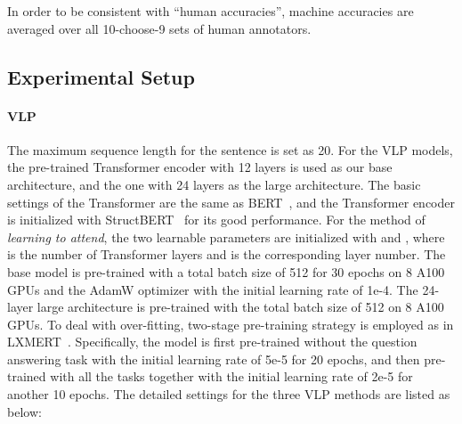 In order to be consistent with ``human accuracies'', machine accuracies are averaged over all 10-choose-9 sets of human annotators.

\subsection{Experimental Setup}
\paragraph{VLP} The maximum sequence length for the sentence is set as 20. For the VLP models, the pre-trained Transformer encoder with 12 layers is used as our base architecture, and the one with 24 layers as the large architecture. The basic settings of the Transformer are the same as BERT~\citep{devlin2018bert}, and the Transformer encoder is initialized with StructBERT~\citep{wang2019structbert} for its good performance. For the method of \emph{learning to attend}, the two learnable parameters are initialized with  and , where  is the number of Transformer layers and  is the corresponding layer number. The base model is pre-trained with a total batch size of 512 for 30 epochs on 8 A100 GPUs and the AdamW optimizer with the initial learning rate of 1e-4. The 24-layer large architecture is pre-trained with the total batch size of 512 on 8 A100 GPUs. To deal with over-fitting, two-stage pre-training strategy is employed as in LXMERT~\citep{tan2019lxmert}. Specifically, the model is first pre-trained without the question answering task with the initial learning rate of 5e-5 for 20 epochs, and then pre-trained with all the tasks together with the initial learning rate of 2e-5 for another 10 epochs. The detailed settings for the three VLP methods are listed as below:
